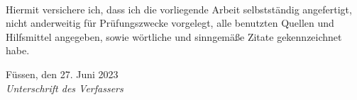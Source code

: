 \newpage
\thispagestyle{empty}


\\ 

\vspace*{2cm}

\noindent
Hiermit versichere ich, dass ich die vorliegende Arbeit selbstständig angefertigt, 
nicht anderweitig für Prüfungszwecke vorgelegt, alle benutzten
Quellen und Hilfsmittel angegeben, sowie wörtliche und sinngemäße Zitate gekennzeichnet habe.
\vspace{2cm}

\noindent
Füssen, den 27. Juni 2023
\hspace*{2cm}%
\dotfill\\
\hspace*{8.5cm}%
\textit{Unterschrift des Verfassers}





